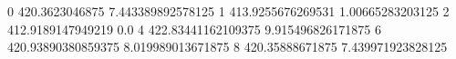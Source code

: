 0 420.3623046875 7.443389892578125
1 413.9255676269531 1.00665283203125
2 412.9189147949219 0.0
4 422.83441162109375 9.915496826171875
6 420.93890380859375 8.019989013671875
8 420.35888671875 7.439971923828125
